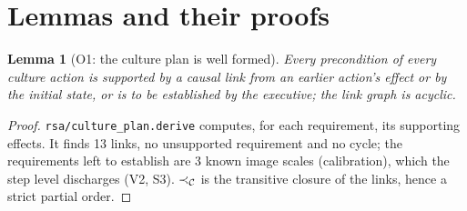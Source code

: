 \documentclass[10pt,a4paper]{article}
\theoremstyle{plain}\newtheorem{theorem}{Theorem}\newtheorem{lemma}{Lemma}\newtheorem{corollary}{Corollary}
\theoremstyle{definition}\newtheorem{definition}{Definition}\newtheorem{assumption}{Assumption}
\theoremstyle{remark}\newtheorem*{remark}{Remark}
\begin{document}
\section{Lemmas and their proofs}
\begin{lemma}[O1: the culture plan is well formed]
Every precondition of every culture action is supported by a causal link from an earlier action's effect or by the
initial state, or is to be established by the executive; the link graph is acyclic.
\end{lemma}
\begin{proof}
\texttt{rsa/culture\_plan.derive} computes, for each requirement, its supporting effects. It finds 13 links, no unsupported requirement and no cycle; the requirements left to establish are 3 known image scales (calibration), which the step level discharges (V2, S3).
$\prec_{\mathcal{C}}$ is the transitive closure of the links, hence a strict partial order.
\end{proof}
\end{document}
